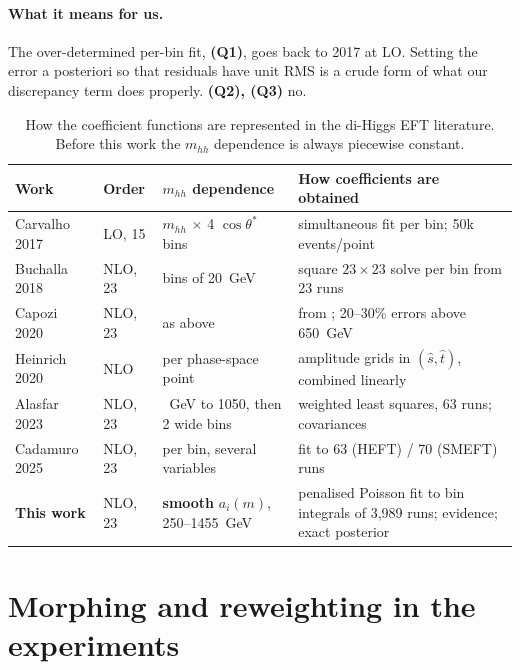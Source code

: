 \paragraph{What it means for us.} The over-determined per-bin fit, \textbf{(Q1)}, goes back
to 2017 at LO. Setting the error a posteriori so that residuals have unit RMS is a crude
form of what our discrepancy term does properly. \textbf{(Q2), (Q3)} no.

\begin{table}[h]
\centering\small
\begin{tabularx}{\linewidth}{@{}l l >{\raggedright\arraybackslash}X
  >{\raggedright\arraybackslash}X@{}}
\toprule
Work & Order & $m_{hh}$ dependence & How coefficients are obtained \\
\midrule
Carvalho 2017 \cite{Carvalho2017} & LO, 15 & 59 $m_{hh}$ $\times$ 4 $\cos\theta^*$ bins
  & simultaneous fit per bin; 50k events/point \\
Buchalla 2018 \cite{Buchalla2018} & NLO, 23 & 40 bins of 20~GeV
  & square $23\times23$ solve per bin from 23 runs \\
Capozi 2020 \cite{Capozi2020} & NLO, 23 & as above & from \cite{Buchalla2018}; 20--30\%
  errors above 650~GeV \\
Heinrich 2020 \cite{Heinrich2020} & NLO & per phase-space point
  & 23 amplitude grids in $(\hat s,\hat t)$, combined linearly \\
Alasfar 2023 \cite{Alasfar2023} & NLO, 23 & 20~GeV to 1050, then 2 wide bins
  & weighted least squares, 63 runs; covariances \\
Cadamuro 2025 \cite{Cadamuro2025} & NLO, 23 & per bin, several variables
  & fit to 63 (HEFT) / 70 (SMEFT) runs \\
\midrule
\textbf{This work} & NLO, 23 & \textbf{smooth} $a_i(m)$, 250--1455~GeV
  & penalised Poisson fit to bin integrals of 3,989 runs; evidence; exact posterior \\
\bottomrule
\end{tabularx}
\caption{How the coefficient functions are represented in the di-Higgs EFT literature.
Before this work the $m_{hh}$ dependence is always piecewise constant.}
\label{tab:hh}
\end{table}

\section{Morphing and reweighting in the experiments}
\label{sec:morph}

